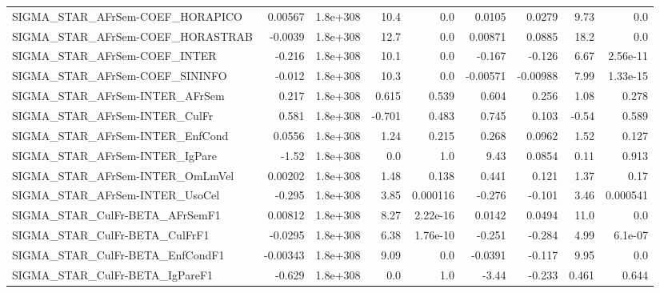 \begin{tabular}{lrrrrrrrr}
SIGMA\_STAR\_AFrSem-COEF\_HORAPICO       &     0.00567 &     1.8e+308 &    10.4 &      0.0 &     0.0105 &      0.0279 &         9.73 &           0.0 \\
SIGMA\_STAR\_AFrSem-COEF\_HORASTRAB      &     -0.0039 &     1.8e+308 &    12.7 &      0.0 &    0.00871 &      0.0885 &         18.2 &           0.0 \\
SIGMA\_STAR\_AFrSem-COEF\_INTER          &      -0.216 &     1.8e+308 &    10.1 &      0.0 &     -0.167 &      -0.126 &         6.67 &      2.56e-11 \\
SIGMA\_STAR\_AFrSem-COEF\_SININFO        &      -0.012 &     1.8e+308 &    10.3 &      0.0 &   -0.00571 &    -0.00988 &         7.99 &      1.33e-15 \\
SIGMA\_STAR\_AFrSem-INTER\_AFrSem        &       0.217 &     1.8e+308 &   0.615 &    0.539 &      0.604 &       0.256 &         1.08 &         0.278 \\
SIGMA\_STAR\_AFrSem-INTER\_CulFr         &       0.581 &     1.8e+308 &  -0.701 &    0.483 &      0.745 &       0.103 &        -0.54 &         0.589 \\
SIGMA\_STAR\_AFrSem-INTER\_EnfCond       &      0.0556 &     1.8e+308 &    1.24 &    0.215 &      0.268 &      0.0962 &         1.52 &         0.127 \\
SIGMA\_STAR\_AFrSem-INTER\_IgPare        &       -1.52 &     1.8e+308 &     0.0 &      1.0 &       9.43 &      0.0854 &         0.11 &         0.913 \\
SIGMA\_STAR\_AFrSem-INTER\_OmLmVel       &     0.00202 &     1.8e+308 &    1.48 &    0.138 &      0.441 &       0.121 &         1.37 &          0.17 \\
SIGMA\_STAR\_AFrSem-INTER\_UsoCel        &      -0.295 &     1.8e+308 &    3.85 & 0.000116 &     -0.276 &      -0.101 &         3.46 &      0.000541 \\
SIGMA\_STAR\_CulFr-BETA\_AFrSemF1        &     0.00812 &     1.8e+308 &    8.27 & 2.22e-16 &     0.0142 &      0.0494 &         11.0 &           0.0 \\
SIGMA\_STAR\_CulFr-BETA\_CulFrF1         &     -0.0295 &     1.8e+308 &    6.38 & 1.76e-10 &     -0.251 &      -0.284 &         4.99 &       6.1e-07 \\
SIGMA\_STAR\_CulFr-BETA\_EnfCondF1       &    -0.00343 &     1.8e+308 &    9.09 &      0.0 &    -0.0391 &      -0.117 &         9.95 &           0.0 \\
SIGMA\_STAR\_CulFr-BETA\_IgPareF1        &      -0.629 &     1.8e+308 &     0.0 &      1.0 &      -3.44 &      -0.233 &        0.461 &         0.644 \\

\end{tabular}
